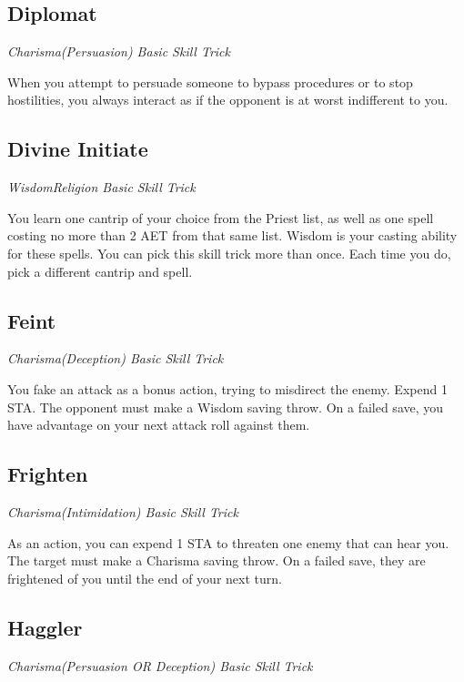 \subsection{Diplomat}\label{st:diplomat}

\textit{Charisma(Persuasion) Basic Skill Trick}

When you attempt to persuade someone to bypass procedures or to stop hostilities, you always interact as if the opponent is at worst indifferent to you.

\subsection{Divine Initiate}

\textit{Wisdom{Religion} Basic Skill Trick}

You learn one cantrip of your choice from the Priest list, as well as one spell costing no more than 2 AET from that same list. Wisdom is your casting ability for these spells. You can pick this skill trick more than once. Each time you do, pick a different cantrip and spell.

\subsection{Feint}\label{st:feint}

\textit{Charisma(Deception) Basic Skill Trick}

You fake an attack as a bonus action, trying to misdirect the enemy. Expend 1 STA. The opponent must make a Wisdom saving throw. On a failed save, you have advantage on your next attack roll against them.

\subsection{Frighten} \label{st:frighten}

\textit{Charisma(Intimidation) Basic Skill Trick}

As an action, you can expend 1 STA to threaten one enemy that can hear you. The target must make a Charisma saving throw. On a failed save, they are frightened of you until the end of your next turn.

\subsection{Haggler}\label{st:haggler}

\textit{Charisma(Persuasion OR Deception) Basic Skill Trick}

